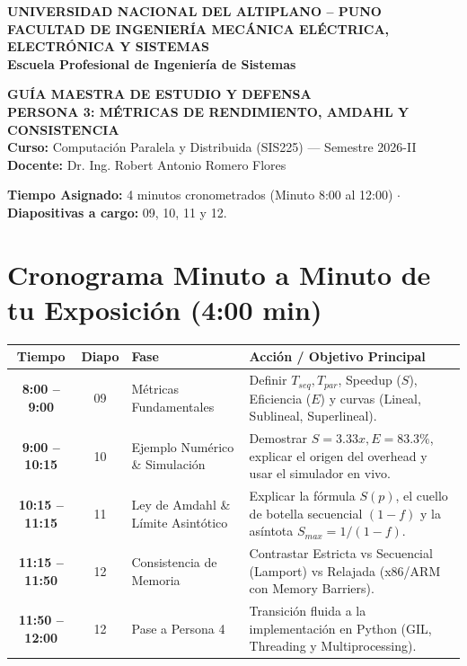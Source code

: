 \documentclass[11pt,a4paper]{article}
\begin{document}
\begin{center}
    {\Large\textbf{\color{primaryNavy}UNIVERSIDAD NACIONAL DEL ALTIPLANO -- PUNO}}\\[2mm]
    {\large\textbf{\color{secondaryOcean}FACULTAD DE INGENIERÍA MECÁNICA ELÉCTRICA, ELECTRÓNICA Y SISTEMAS}}\\[1mm]
    {\textbf{Escuela Profesional de Ingeniería de Sistemas}}\\[4mm]
    
    \begin{tcolorbox}[colback=primaryNavy,colframe=primaryNavy,arc=4mm,center,width=0.95\textwidth]
        \centering\color{white}
        \Large\textbf{GUÍA MAESTRA DE ESTUDIO Y DEFENSA}\\[1.5mm]
        \large\textbf{PERSONA 3: MÉTRICAS DE RENDIMIENTO, AMDAHL Y CONSISTENCIA}\\[1mm]
        \small\textbf{Curso:} Computación Paralela y Distribuida (SIS225) --- Semestre 2026-II\\
        \small\textbf{Docente:} Dr. Ing. Robert Antonio Romero Flores
    \end{tcolorbox}
\end{center}

\vspace{2mm}
\noindent\textbf{Tiempo Asignado:} 4 minutos cronometrados (Minuto 8:00 al 12:00) $\cdot$ \textbf{Diapositivas a cargo:} 09, 10, 11 y 12.

\section{Cronograma Minuto a Minuto de tu Exposición (4:00 min)}

\begin{table}[h!]
\centering
\small
\begin{tabular}{@{}cclp{7.5cm}@{}}
\toprule
\textbf{Tiempo} & \textbf{Diapo} & \textbf{Fase} & \textbf{Acción / Objetivo Principal} \\ \midrule
\textbf{8:00 -- 9:00} & 09 & Métricas Fundamentales & Definir $T_{seq}, T_{par}$, Speedup ($S$), Eficiencia ($E$) y curvas (Lineal, Sublineal, Superlineal). \\
\textbf{9:00 -- 10:15} & 10 & Ejemplo Numérico \& Simulación & Demostrar $S=3.33x, E=83.3\%$, explicar el origen del overhead y usar el simulador en vivo. \\
\textbf{10:15 -- 11:15} & 11 & Ley de Amdahl \& Límite Asintótico & Explicar la fórmula $S(p)$, el cuello de botella secuencial $(1-f)$ y la asíntota $S_{max}=1/(1-f)$. \\
\textbf{11:15 -- 11:50} & 12 & Consistencia de Memoria & Contrastar Estricta vs Secuencial (Lamport) vs Relajada (x86/ARM con Memory Barriers). \\
\textbf{11:50 -- 12:00} & 12 & Pase a Persona 4 & Transición fluida a la implementación en Python (GIL, Threading y Multiprocessing). \\ \bottomrule
\end{tabular}
\end{table}
\end{document}
